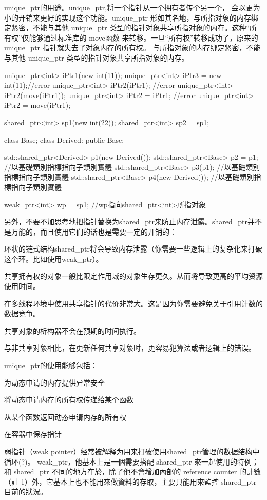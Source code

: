 unique_ptr的用途。unique_ptr,将一个指针从一个拥有者传个另一个， 会以更为小的开销来更好的实现这个功能。unique_ptr 形如其名地，与所指对象的内存绑定紧密，不能与其他 unique_ptr 
类型的指针对象共享所指对象的内存。这种“所有权”仅能够通过标准库的 move函数 来转移。一旦“所有权”转移成功了，原来的 unique_ptr 指针就失去了对象内存的所有权。
与所指对象的内存绑定紧密，不能与其他 unique_ptr 类型的指针对象共享所指对象的内存。
\begin{Code}
	unique_ptr<int> iPtr1(new int(11));
	unique_ptr<int> iPtr3 = new int(11);//error
	unique_ptr<int> iPtr2(iPtr1);       //error
	unique_ptr<int> iPtr2(move(iPtr1));
	unique_ptr<int> iPtr2 = iPtr1;      //error
	unique_ptr<int> iPtr2 = move(iPtr1);
	
	shared_ptr<int> sp1(new int(22)); 
	shared_ptr<int> sp2 = sp1;
	
	class Base{};
	class Derived: public Base{};
	
	std::shared_ptr<Derived> p1(new Derived()); 
	std::shared_ptr<Base> p2 = p1; //以基礎類別指標指向子類別實體
	std::shared_ptr<Base> p3(p1); //以基礎類別指標指向子類別實體
	std::shared_ptr<Base> p4(new Derived()); //以基礎類別指標指向子類別實體
	
	weak_ptr<int> wp = sp1;    //wp指向shared_ptr<int>所指对象
\end{Code}


另外，不要不加思考地把指针替换为shared_ptr来防止内存泄露。shared_ptr并不是万能的，而且使用它们的话也是需要一定的开销的：
\begindot
\item 环状的链式结构shared_ptr将会导致内存泄露（你需要一些逻辑上的复杂化来打破这个环。比如使用weak_ptr）。
\item 共享拥有权的对象一般比限定作用域的对象生存更久。从而将导致更高的平均资源使用时间。
\item 在多线程环境中使用共享指针的代价非常大。这是因为你需要避免关于引用计数的数据竞争。
\item 共享对象的析构器不会在预期的时间执行。
\item 与非共享对象相比，在更新任何共享对象时，更容易犯算法或者逻辑上的错误。
\myenddot

unique_ptr的使用能够包括：
\begindot
\item 为动态申请的内存提供异常安全
\item 将动态申请内存的所有权传递给某个函数
\item 从某个函数返回动态申请内存的所有权
\item 在容器中保存指针
\myenddot

弱指针（weak pointer）经常被解释为用来打破使用shared_ptr管理的数据结构中循环(?)。  weak_ptr，他基本上是一個需要搭配 shared_ptr 來一起使用的特例；和 shared_ptr 不同的地方在於，除了他不會增加內部的 reference 
counter 的計數（註 1）外，它基本上也不能用來做資料的存取，主要只能用來監控 shared_ptr 目前的狀況。

